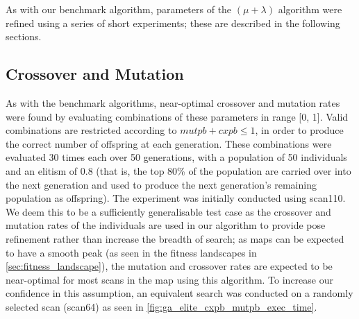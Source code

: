 \documentclass[authoryearcitations]{UoYCSproject}
\begin{document}
As with our benchmark algorithm, parameters of the $(\mu + \lambda)$ algorithm were refined using a series of short experiments; these are described in the following sections. \newline



\subsection{Crossover and Mutation}
\label{subsec:elite_cxpb_mupb}
As with the benchmark algorithms, near-optimal crossover and mutation rates were found by evaluating combinations of these parameters in range [0, 1]. Valid combinations are restricted according to $mutpb + cxpb \leqslant 1$, in order to produce the correct number of offspring at each generation. These combinations were evaluated 30 times each over 50 generations, with a population of 50 individuals and an elitism of 0.8 (that is, the top 80\% of the population are carried over into the next generation and used to produce the next generation's remaining population as offspring). The experiment was initially conducted using scan110. We deem this to be a sufficiently generalisable test case as the crossover and mutation rates of the individuals are used in our algorithm to provide pose refinement rather than increase the breadth of search; as maps can be expected to have a smooth peak (as seen in the fitness landscapes in \autoref{sec:fitness_landscape}), the mutation and crossover rates are expected to be near-optimal for most scans in the map using this algorithm. To increase our confidence in this assumption, an equivalent search was conducted on a randomly selected scan (scan64) as seen in \autoref{fig:ga_elite_cxpb_mutpb_exec_time}.
\end{document}
